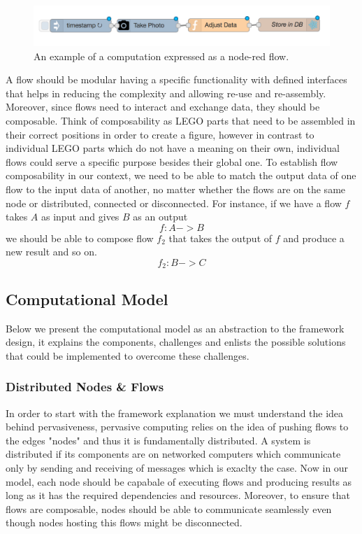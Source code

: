 \begin{figure}[H]
	\centering
	\includegraphics[scale=0.5]{images/db-out.png} 
	\caption{An example of a computation expressed as a node-red flow.}
	\label{fig:flow}
\end{figure}

 A flow should be modular having a specific functionality with defined interfaces that helps in reducing the complexity and allowing re-use and re-assembly. Moreover, since flows need to interact and exchange data, they should be composable. Think of composability as LEGO parts that need to be assembled in their correct positions in order to create a figure, however in contrast to individual LEGO parts which do not have a meaning on their own, individual flows could serve a specific purpose besides their global one. To establish flow composability in our context, we need to be able to match the output data of one flow to the input data of another, no matter whether the flows are on the same node or distributed, connected or disconnected. For instance, if we have a flow \(f\) takes \(A\) as input and gives \(B\) as an output
\[ f : A  -> B  \]
we should be able to compose flow \(f_2\) that takes the output of \(f\) and produce a new result and so on. 
\[ f_2 : B  -> C  \]

\subsection{Computational Model}

Below we present the computational model as an abstraction to the framework design, it explains the components, challenges and enlists the possible solutions that could be implemented to overcome these challenges. 	

\subsubsection{Distributed Nodes \& Flows}
In order to start with the framework explanation we must understand the idea behind pervasiveness, pervasive computing relies on the idea of pushing flows to the edges "nodes" and thus it is fundamentally distributed. A system is distributed if its components  are on networked computers which communicate only by sending and receiving of messages \cite{DSYS} which is exaclty the case. Now in our model, each node should be capabale of executing flows and producing results as long as it  has the required dependencies and resources. Moreover, to ensure that flows are composable, nodes should be able to communicate seamlessly even though nodes hosting this flows might be disconnected.


